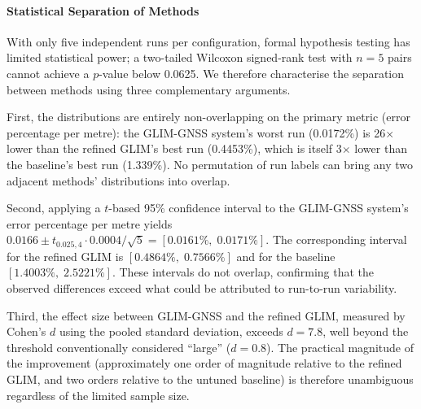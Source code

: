 \paragraph{Statistical Separation of Methods}
With only five independent runs per configuration, formal hypothesis testing has limited statistical power; a two-tailed Wilcoxon signed-rank test with $n = 5$ pairs cannot achieve a $p$-value below 0.0625. We therefore characterise the separation between methods using three complementary arguments.

First, the distributions are entirely non-overlapping on the primary metric (error percentage per metre): the GLIM-GNSS system's worst run (0.0172\%) is 26$\times$ lower than the refined GLIM's best run (0.4453\%), which is itself 3$\times$ lower than the baseline's best run (1.339\%). No permutation of run labels can bring any two adjacent methods' distributions into overlap.

Second, applying a $t$-based 95\% confidence interval to the GLIM-GNSS system's error percentage per metre yields $0.0166 \pm t_{0.025,4} \cdot 0.0004/\sqrt{5} = [0.0161\%,\; 0.0171\%]$. The corresponding interval for the refined GLIM is $[0.4864\%,\; 0.7566\%]$ and for the baseline $[1.4003\%,\; 2.5221\%]$. These intervals do not overlap, confirming that the observed differences exceed what could be attributed to run-to-run variability.

Third, the effect size between GLIM-GNSS and the refined GLIM, measured by Cohen's $d$ using the pooled standard deviation, exceeds $d = 7.8$, well beyond the threshold conventionally considered ``large'' ($d = 0.8$). The practical magnitude of the improvement (approximately one order of magnitude relative to the refined GLIM, and two orders relative to the untuned baseline) is therefore unambiguous regardless of the limited sample size.